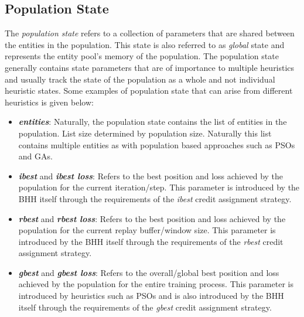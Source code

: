 \subsection{Population State}
\label{sec:bhh:entity_pool:population_state}


The \textit{population state} refers to a collection of parameters that are shared between the entities in the population. This state is also referred to as \textit{global} state and represents the entity pool's memory of the population. The population state generally contains state parameters that are of importance to multiple heuristics and usually track the state of the population as a whole and not individual heuristic states. Some examples of population state that can arise from different heuristics is given below:

\begin{itemize}
    \item \textbf{\textit{entities}}: Naturally, the population state contains the list of entities in the population. List size determined by population size. Naturally this list contains multiple entities as with population based approaches such as \acp{PSO} and \acp{GA}. 
    
    \item \textbf{\textit{ibest}} and \textbf{\textit{ibest loss}}: Refers to the best position and loss achieved by the population for the current iteration/step. This parameter is introduced by the \ac{BHH} itself through the requirements of the \textit{ibest} credit assignment strategy.
    
    \item \textbf{\textit{rbest}} and \textbf{\textit{rbest loss}}: Refers to the best position and loss achieved by the population for the current replay buffer/window size. This parameter is introduced by the \ac{BHH} itself through the requirements of the \textit{rbest} credit assignment strategy.
    
    \item \textbf{\textit{gbest}} and \textbf{\textit{gbest loss}}: Refers to the overall/global best position and loss achieved by the population for the entire training process. This parameter is introduced by heuristics such as \acp{PSO} and is also introduced by the \ac{BHH} itself through the requirements of the \textit{gbest} credit assignment strategy.
\end{itemize}

